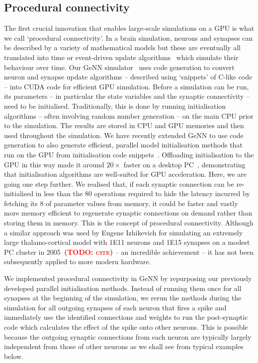 \documentclass[9pt,twocolumn,twoside,lineno]{pnas-new}
\newcommand{\todo}[1]{\textbf{\textsc{\textcolor{red}{(TODO: #1)}}}}
\begin{document}
\subsection*{Procedural connectivity}
The first crucial innovation that enables large-scale simulations on a GPU is what we call `procedural connectivity'.
In a brain simulation, neurons and synapses can be described by a variety of mathematical models but these are eventually all translated into time or event-driven update algorithms~\citep{Brette2007} which simulate their behaviour over time.
Our GeNN simulator~\citep{Yavuz2016} uses code generation to convert neuron and synapse update algorithms -- described using `snippets' of C-like code -- into CUDA code for efficient GPU simulation.
Before a simulation can be run, its parameters -- in particular the state variables and the synaptic connectivity -- need to be initialised.
Traditionally, this is done by running initialisation algorithms -- often involving random number generation -- on the main CPU prior to the simulation.
The results are stored in CPU and GPU memories and then used throughout the simulation.
We have recently extended GeNN to use code generation to also generate efficient, parallel model initialisation methods that run on the GPU from initialisation code snippets~\citep{Knight2018}.
Offloading initialisation to the GPU in this way made it around $20\times$ faster on a desktop PC~\citep{Knight2018}, demonstrating that initialisation algorithms are well-suited for GPU acceleration.
Here, we are going one step further.
We realised that, if each synaptic connection can be re-initialised in less than the 80 operations required to hide the latency incurred by fetching its \SI{8}{\byte} of parameter values from memory, it could be faster and vastly more memory efficient to regenerate synaptic connections on demand rather than storing them in memory.
This is the concept of procedural connectivity.
Although a similar approach was used by Eugene Izhikevich for simulating an extremely large thalamo-cortical model with \num{1E11} neurons and \num{1E15} synapses on a modest PC cluster in 2005~\todo{cite} -- an incredible achievement -- it has not been subsequently applied to more modern hardware.  

We implemented procedural connectivity in GeNN by repurposing our previously developed parallel initialisation methods.
Instead of running them once for all synapses at the beginning of the simulation, we rerun the methods during the simulation for all outgoing synapses of each neuron that fires a spike and immediately use the identified connections and weights to run the post-synaptic code which calculates the effect of the spike onto other neurons.
This is possible because the outgoing synaptic connections from each neuron are typically largely independent from those of other neurons as we shall see from typical examples below.
\end{document}
